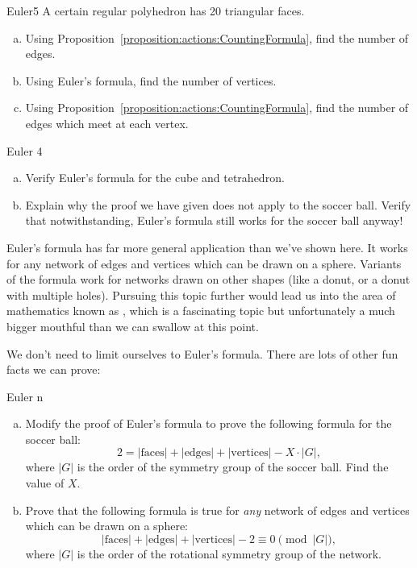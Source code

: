 \begin{exercise}{Euler5}
A certain regular polyhedron has 20 triangular faces. 
\begin{enumerate}[(a)]
\item
Using Proposition~\ref{proposition:actions:CountingFormula}, find the number of edges.
\item
Using Euler's formula, find the number of vertices.
\item
Using Proposition~\ref{proposition:actions:CountingFormula}, find the number of edges which meet at each vertex.
\end{enumerate}
\end {exercise}

\begin{exercise}{Euler 4}
\begin{enumerate}[(a)]
\item Verify Euler's formula for the cube and tetrahedron.
\item Explain why the proof we have given does not apply to the soccer ball. Verify that notwithstanding, Euler's formula still works for the soccer ball anyway! 
\end{enumerate}
\end {exercise}

\begin{rem}
 Euler's formula has far more general application than we've shown here. It works for any network of edges and vertices which can be drawn on a sphere. Variants of the formula work for networks drawn on other shapes (like a donut, or a donut with multiple holes).  Pursuing this topic further would lead us into the area  of mathematics known as , which is a fascinating topic but unfortunately a much bigger mouthful than we can swallow at this point. 
\end{rem}

We don't need to limit ourselves to Euler's formula.  There are lots of other fun facts we can prove:

\begin{exercise}{Euler n}
\begin{enumerate}[(a)]
\item Modify the proof of Euler's formula to prove the following formula for the soccer ball:
\[2 =  |\text{faces}| + |\text{edges}| + |\text{vertices}| - X \cdot |G|,\]
where $|G|$ is the order of the symmetry group of the soccer ball.  Find the value of $X$.
\item 
Prove that the following formula is true for \emph{any} network of edges and vertices which can be drawn on a sphere:
\[ |\text{faces}| + |\text{edges}| + |\text{vertices}| -2 \equiv 0 \pmod{|G|},\]
where $|G|$ is the order of the rotational symmetry group of the network.
\end{enumerate}
\end{exercise}


